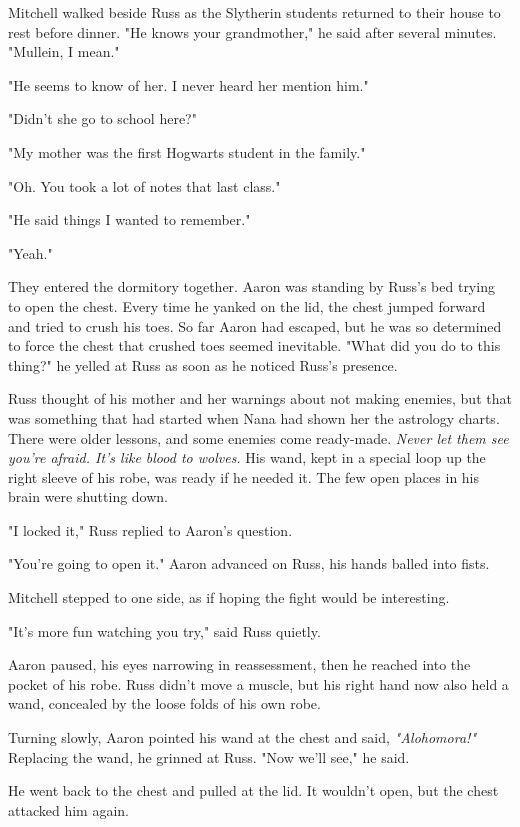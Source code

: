Mitchell walked beside Russ as the Slytherin students returned to their house to rest before dinner. "He knows your grandmother," he said after several minutes. "Mullein, I mean."

"He seems to{\el} know of her. I never heard{\el} her mention him."

"Didn't she go to school here?"

"My mother was{\el} the first Hogwarts student in{\el} the family."

"Oh. You took a lot of notes that last class."

"He said things I{\el} wanted to remember."

"Yeah."

They entered the dormitory together. Aaron was standing by Russ's bed trying to open the chest. Every time he yanked on the lid, the chest jumped forward and tried to crush his toes. So far Aaron had escaped, but he was so determined to force the chest that crushed toes seemed inevitable. "What did you do to this thing?" he yelled at Russ as soon as he noticed Russ's presence.

Russ thought of his mother and her warnings about not making enemies, but that was something that had started when Nana had shown her the astrology charts. There were older lessons, and some enemies come ready-made. \emph{Never let them see you're afraid. It's like blood to wolves.} His wand, kept in a special loop up the right sleeve of his robe, was ready if he needed it. The few open places in his brain were shutting down.

"I locked it," Russ replied to Aaron's question.

"You're going to open it." Aaron advanced on Russ, his hands balled into fists.

Mitchell stepped to one side, as if hoping the fight would be interesting.

"It's more fun watching you try," said Russ quietly.

Aaron paused, his eyes narrowing in reassessment, then he reached into the pocket of his robe. Russ didn't move a muscle, but his right hand now also held a wand, concealed by the loose folds of his own robe.

Turning slowly, Aaron pointed his wand at the chest and said, \emph{"Alohomora!"} Replacing the wand, he grinned at Russ. "Now we'll see," he said.

He went back to the chest and pulled at the lid. It wouldn't open, but the chest attacked him again.


